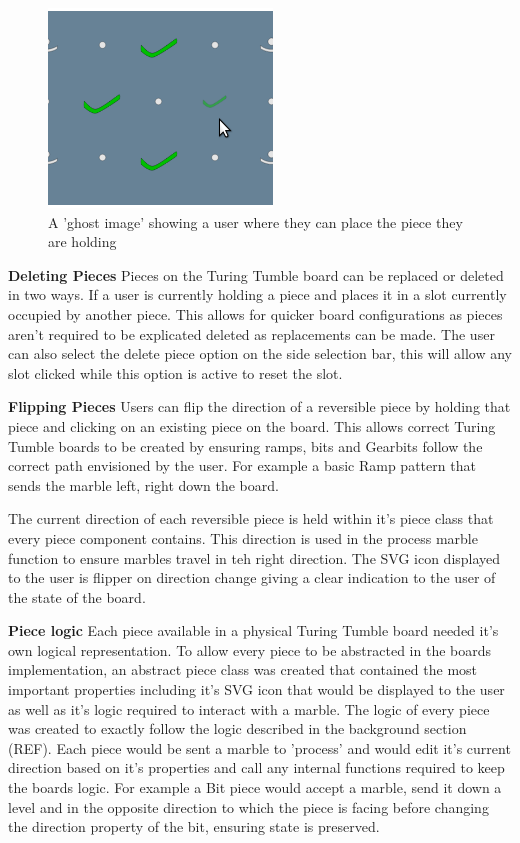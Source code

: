 \documentclass{l4proj}
\begin{document}
\begin{figure}
    \centering
    \includegraphics[width=0.4\linewidth]{images/ghostImage.png}
    \caption{A 'ghost image' showing a user where they can place the piece they are holding}
    \label{fig:ghostPiece}
\end{figure}

\textbf{Deleting Pieces}
Pieces on the Turing Tumble board can be replaced or deleted in two ways. If a user is currently holding a piece and places it in a slot currently occupied by another piece. This allows for quicker board configurations as pieces aren't required to be explicated deleted as replacements can be made. The user can also select the delete piece option on the side selection bar, this will allow any slot clicked while this option is active to reset the slot.

\textbf{Flipping Pieces}
Users can flip the direction of a reversible piece by holding that piece and clicking on an existing piece on the board. This allows correct Turing Tumble boards to be created by ensuring ramps, bits and Gearbits follow the correct path envisioned by the user. For example a basic Ramp pattern that sends the marble left, right down the board. 

The current direction of each reversible piece is held within it's piece class that every piece component contains. This direction is used in the process marble function to ensure marbles travel in teh right direction. The SVG icon displayed to the user is flipper on direction change giving a clear indication to the user of the state of the board.

\textbf{Piece logic}
Each piece available in a physical Turing Tumble board needed it's own logical representation. To allow every piece to be abstracted in the boards implementation, an abstract piece class was created that contained the most important properties including it's SVG icon that would be displayed to the user as well as it's logic required to interact with a marble. The logic of every piece was created to exactly follow the logic described in the background section (REF). Each piece would be sent a marble to 'process' and would edit it's current direction based on it's properties and call any internal functions required to keep the boards logic. For example a Bit piece would accept a marble, send it down a level and in the opposite direction to which the piece is facing before changing the direction property of the bit, ensuring state is preserved. 
\end{document}
